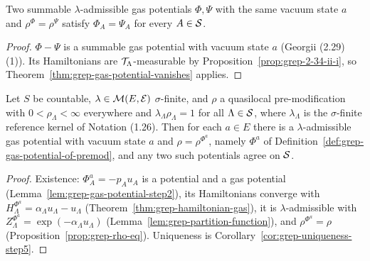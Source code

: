 \begin{corollary}
    \label{cor:grep-uniqueness-step5}
    \leanok

    Two summable $\lambda$-admissible gas potentials $\Phi,\Psi$ with the same vacuum state $a$ and
    $\rho^\Phi = \rho^\Psi$ satisfy $\Phi_A = \Psi_A$ for every $A \in \mathcal{S}$.
\end{corollary}
\begin{proof}
    \leanok

    $\Phi - \Psi$ is a summable gas potential with vacuum state $a$ (Georgii (2.29)(1)).  Its
    Hamiltonians are $\mathcal{T}_\Lambda$-measurable by Proposition~\ref{prop:grep-2-34-ii-i}, so
    Theorem~\ref{thm:grep-gas-potential-vanishes} applies.
\end{proof}

\begin{theorem}
    \label{thm:grep-2-30}
    \leanok

    Let $S$ be countable, $\lambda \in \mathcal{M}(E,\mathcal{E})$ $\sigma$-finite, and $\rho$ a
    quasilocal pre-modification with $0 < \rho_\Lambda < \infty$ everywhere and
    $\lambda_\Lambda \rho_\Lambda = 1$ for all $\Lambda \in \mathcal{S}$, where $\lambda_\Lambda$ is the
    $\sigma$-finite reference kernel of Notation (1.26).  Then for each $a \in E$ there is a
    $\lambda$-admissible gas potential with vacuum state $a$ and $\rho = \rho^{\Phi^a}$, namely
    $\Phi^a$ of Definition~\ref{def:grep-gas-potential-of-premod}, and any two such potentials
    agree on $\mathcal{S}$.
\end{theorem}
\begin{proof}
    \leanok

    Existence: $\Phi^a_A = -p_A u_A$ is a potential and a gas potential
    (Lemma~\ref{lem:grep-gas-potential-step2}), its Hamiltonians converge with
    $H^{\Phi^a}_\Lambda = \alpha_\Lambda u_\Lambda - u_\Lambda$
    (Theorem~\ref{thm:grep-hamiltonian-gas}), it is $\lambda$-admissible with
    $Z^{\Phi^a}_\Lambda = \exp(-\alpha_\Lambda u_\Lambda)$
    (Lemma~\ref{lem:grep-partition-function}), and $\rho^{\Phi^a} = \rho$
    (Proposition~\ref{prop:grep-rho-eq}).  Uniqueness is
    Corollary~\ref{cor:grep-uniqueness-step5}.
\end{proof}

